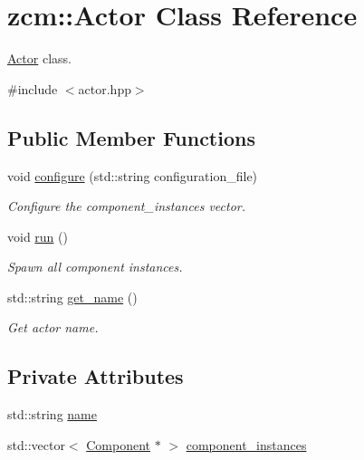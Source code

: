 \hypertarget{classzcm_1_1Actor}{\section{zcm\-:\-:Actor Class Reference}
\label{classzcm_1_1Actor}
}


\hyperlink{classzcm_1_1Actor}{Actor} class.  




{\ttfamily \#include $<$actor.\-hpp$>$}

\subsection*{Public Member Functions}
\begin{DoxyCompactItemize}
\item 
void \hyperlink{classzcm_1_1Actor_a28d09bc2ef3635296c988a2b32d10c0b}{configure} (std\-::string configuration\-\_\-file)
\begin{DoxyCompactList}\small\item\em Configure the component\-\_\-instances vector. \end{DoxyCompactList}\item 
void \hyperlink{classzcm_1_1Actor_a5d968074bf915f3e021cc287bff27879}{run} ()
\begin{DoxyCompactList}\small\item\em Spawn all component instances. \end{DoxyCompactList}\item 
std\-::string \hyperlink{classzcm_1_1Actor_ae81346a318c26d68a5b78848ead2518f}{get\-\_\-name} ()
\begin{DoxyCompactList}\small\item\em Get actor name. \end{DoxyCompactList}\end{DoxyCompactItemize}
\subsection*{Private Attributes}
\begin{DoxyCompactItemize}
\item 
std\-::string \hyperlink{classzcm_1_1Actor_a2b0816bbe28c8f96fa882b625be004ee}{name}
\item 
std\-::vector$<$ \hyperlink{classzcm_1_1Component}{Component} $\ast$ $>$ \hyperlink{classzcm_1_1Actor_abb7a2cdfc286c8821ac6f9ad3da40a49}{component\-\_\-instances}
\end{DoxyCompactItemize}


